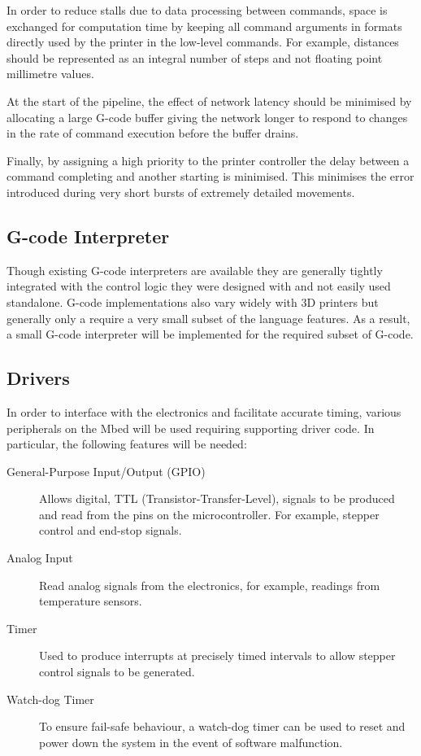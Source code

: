 			In order to reduce stalls due to data processing between commands, space
			is exchanged for computation time by keeping all command arguments in
			formats directly used by the printer in the low-level commands. For
			example, distances should be represented as an integral number of steps
			and not floating point millimetre values.
			
			At the start of the pipeline, the effect of network latency should be
			minimised by allocating a large G-code buffer giving the network longer to
			respond to changes in the rate of command execution before the buffer
			drains.
			
			Finally, by assigning a high priority to the printer controller the delay
			between a command completing and another starting is minimised.  This
			minimises the error introduced during very short bursts of extremely
			detailed movements.
		
		\subsection{G-code Interpreter}
			
			Though existing G-code interpreters are available they are generally
			tightly integrated with the control logic they were designed with and not
			easily used standalone. G-code implementations also vary widely with 3D
			printers but generally only a require a very small subset of the language
			features. As a result, a small G-code interpreter will be implemented for
			the required subset of G-code.
		
		\subsection{Drivers}
			
			In order to interface with the electronics and facilitate accurate timing,
			various peripherals on the Mbed will be used requiring supporting driver
			code. In particular, the following features will be needed:
			
			\begin{description}
				\item[General-Purpose Input/Output (GPIO)]
					Allows digital, TTL (Transistor-Transfer-Level), signals to be
					produced and read from the pins on the microcontroller. For example,
					stepper control and end-stop signals.
				
				\item[Analog Input]
					Read analog signals from the electronics, for example, readings from
					temperature sensors.
				
				\item[Timer]
					Used to produce interrupts at precisely timed intervals to allow
					stepper control signals to be generated.
				
				\item[Watch-dog Timer]
					To ensure fail-safe behaviour, a watch-dog timer can be used to reset
					and power down the system in the event of software malfunction.
			\end{description}
	
